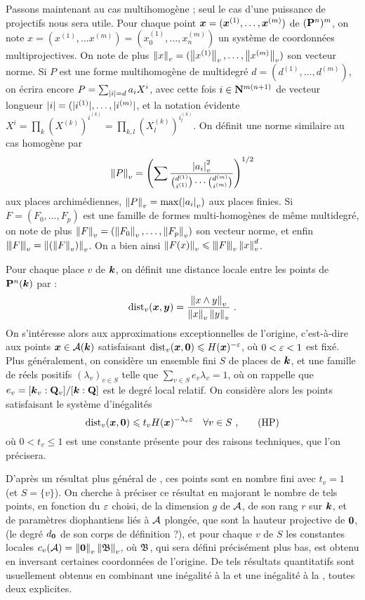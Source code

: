 Passons maintenant au cas multihomogène ; seul le cas d'une puissance de
projectifs nous sera utile. Pour chaque point ${\boldsymbol{x}} = ({\boldsymbol{x}}^{(1)}, \dots,
{\boldsymbol{x}}^{(m)})$ de $(\mathbf{P}^n)^m$, on note $x = (x^{(1)}, \dots x^{(m)}) =
(x_0^{(1)}, \dots, x_n^{(m)})$ un système de coordonnées multiprojectives. On
note de plus $\left\lVert x\right\rVert_{v} = (\left\lVert x^{(1)}\right\rVert_{v},\dots, \left\lVert x^{(m)}\right\rVert_{v})$ son vecteur norme.
Si $P$ est une forme multihomogène de multidegré $d= (d^{(1)}, \dots,
d^{(m)})$, on écrira encore $P = \sum_{{|i|}=d} a_i X^i$, avec cette fois $i
\in \mathbf{N}^{m(n+1)}$ de vecteur longueur ${|i|} = (|i^{(1)}|, \dots, |i^{(m)}|$,
et la notation évidente $X^i = \prod_{k} (X^{(k)})^{i^{(k)}} = \prod_{k, l}
(X_l^{(k)})^{i_l^{(k)}}$. On définit une norme similaire au cas homogène par
\[
  \left\lVert P\right\rVert_{v} = \left( \sum \frac{ \left\lvert a_i\right\rvert_{v}^2}{\binom{d^{(1)}}{i^{(1)}} \cdots
  \binom{d^{(m)}}{i^{(m)}} } \right)^{1/2}
\]
aux places archimédiennes, $\left\lVert P\right\rVert_{v} = \max(\left\lvert a_i\right\rvert_{v})$ aux places finies. Si
$F = (F_0, \dots, F_p)$ est une famille de formes multi-homogènes de même
multidegré, on note de plus $\left\lVert F\right\rVert_{v} = (\left\lVert F_0\right\rVert_{v}, \dots, \left\lVert F_p\right\rVert_{v})$ son vecteur
norme, et enfin $\left\lvert\hspace{-1pt} \left\lvert\hspace{-1pt} \left\lvert F\right\rvert \hspace{-1pt}\right\rvert \hspace{-1pt}\right\rvert_{v} = \left\lVert(\left\lVert F\right\rVert_{v})\right\rVert_{v}$. On a bien ainsi $\left\lVert F(x)\right\rVert_{v} \leqslant
\left\lvert\hspace{-1pt} \left\lvert\hspace{-1pt} \left\lvert F\right\rvert \hspace{-1pt}\right\rvert \hspace{-1pt}\right\rvert_{v}\left\lVert x\right\rVert_{v}^d$.

Pour chaque place $v$ de $\boldsymbol{k}$, on définit une distance locale entre les
points de $\mathbf{P}^n(\boldsymbol{k})$ par :
\[
  \mathrm{dist}_v({\boldsymbol{x}}, {\boldsymbol{y}}) = \frac{\left\lVert x\wedge y \right\rVert_{v}}{\left\lVert x\right\rVert_{v}\left\lVert y\right\rVert_{v}}\text{ .}
\]
On s'intéresse alors aux approximations exceptionnelles de l'origine,
c'est-à-dire aux points ${\boldsymbol{x}} \in \mathcal{A}(\boldsymbol{k})$ satisfaisant $\mathrm{dist}_v({\boldsymbol{x}}, {\boldsymbol{0}}) \leqslant
H({\boldsymbol{x}})^{-\varepsilon}$, où $0<\varepsilon<1$ est fixé.  Plus généralement, on considère un
ensemble fini $S$ de places de $\boldsymbol{k}$, et une famille de réels positifs
$(\lambda_v)_{v\in S}$ telle que $\sum_{v\in S} e_v \lambda_v = 1$, où on
rappelle que $e_v = [\boldsymbol{k}_v : \mathbf{Q}_v]/[\boldsymbol{k} : \mathbf{Q}]$ est le degré local relatif.
On considère alors les points satisfaisant le système d'inégalités
\[
  \mathrm{dist}_v({\boldsymbol{x}}, {\boldsymbol{0}}) \leqslant t_v H({\boldsymbol{x}})^{-\lambda_v \varepsilon} \quad
  \forall v \in S \text{ ,} \tag{HP} \label{hyp}
\]
où $0<t_v\le 1$ est une constante présente pour des raisons techniques, que
l'on précisera.

D'après un résultat plus général de , ces points sont en nombre
fini avec $t_v = 1$ (et $S= \{v\}$). On cherche à préciser ce résultat en
majorant le nombre de tels points, en fonction du $\varepsilon$ choisi, de la
dimension $g$ de $\mathcal{A}$, de son rang $r$ sur $\boldsymbol{k}$, et de paramètres
diophantiens liés à $\mathcal{A}$ plongée, que sont la hauteur projective de ${\boldsymbol{0}}$, (le
degré $d_{\boldsymbol{0}}$ de son corps de définition ?), et pour chaque $v$ de $S$ les
constantes locales $c_v(\mathcal{A}) = \left\lVert{\boldsymbol{0}}\right\rVert_{v}\left\lVert\mathfrak{B}\right\rVert_{v}$, où $\mathfrak{B}$, qui sera défini
précisément plus bas, est obtenu en inversant certaines coordonnées de
l'origine. De tels résultats quantitatifs sont usuellement obtenus en
combinant une inégalité à la  et une inégalité à la ,
toutes deux explicites.

